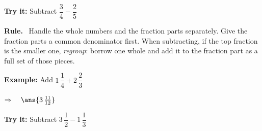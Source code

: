 \documentclass[12pt]{article}
\begin{document}
\begin{tryitbox}
\textbf{Try it:} \quad Subtract $\dfrac{3}{4} - \dfrac{2}{5}$\\[2pt]
\end{tryitbox}


\begin{formulabox}
\textbf{Rule.} \ Handle the whole numbers and the fraction parts separately. Give the fraction parts a common denominator first. When subtracting, if the top fraction is the smaller one, \emph{regroup}: borrow one whole and add it to the fraction part as a full set of those pieces.
\end{formulabox}

\begin{examplebox}
\textbf{Example:} \quad Add $1\,\dfrac{1}{4} + 2\,\dfrac{2}{3}$


$\Rightarrow\quad \ans{3\,\tfrac{11}{12}}$
\end{examplebox}

\begin{tryitbox}
\textbf{Try it:} \quad Subtract $3\,\dfrac{1}{2} - 1\,\dfrac{1}{3}$\\[2pt]
\end{tryitbox}
\end{document}
